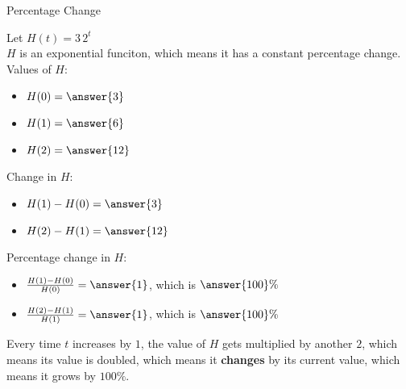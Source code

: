 \documentclass{ximera}
\begin{document}
\begin{example} Percentage Change



Let $H(t) = 3 \, 2^t$ \\

$H$ is an exponential funciton, which means it has a constant percentage change. \\

Values of $H$:

\begin{itemize}
\item $H(0) = \answer{3}$

\item $H(1) = \answer{6}$

\item $H(2) = \answer{12}$
\end{itemize}



Change in $H$:

\begin{itemize}
\item $H(1) - H(0) = \answer{3}$

\item $H(2) - H(1) = \answer{12}$

\end{itemize}





Percentage change in $H$:

\begin{itemize}
\item $\frac{H(1) - H(0)}{H(0)} = \answer{1}$, which is $\answer{100}\%$

\item $\frac{H(2) - H(1)}{H(1)} = \answer{1}$, which is $\answer{100}\%$

\end{itemize}






\end{example}



Every time $t$ increases by $1$, the value of $H$ gets multiplied by another $2$, which means its value is doubled, which means it \textbf{changes} by its current value, which means it grows by $100\%$.
\end{document}

